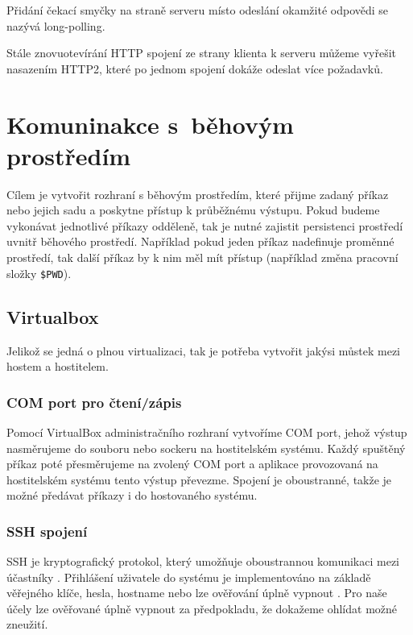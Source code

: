 Přidání čekací smyčky na straně serveru místo odeslání okamžité odpovědi se nazývá long-polling.

Stále znovuotevírání HTTP spojení ze strany klienta k serveru můžeme vyřešit nasazením HTTP2, které po jednom spojení dokáže odeslat více požadavků.

\section{Komuninakce s~běhovým prostředím}

Cílem je vytvořit rozhraní s běhovým prostředím, které přijme zadaný příkaz nebo jejich sadu a poskytne přístup k průběžnému výstupu.
Pokud budeme vykonávat jednotlivé příkazy odděleně, tak je nutné zajistit persistenci prostředí uvnitř běhového prostředí.
Například pokud jeden příkaz nadefinuje proměnné prostředí, tak další příkaz by k nim měl mít přístup (například změna pracovní složky \verb|$PWD|).

\subsection{Virtualbox}

Jelikož se jedná o plnou virtualizaci, tak je potřeba vytvořit jakýsi můstek mezi hostem a hostitelem.

\subsubsection{COM port pro čtení/zápis}

Pomocí VirtualBox administračního rozhraní vytvoříme COM port, jehož výstup nasměrujeme do souboru nebo sockeru na hostitelském systému.
Každý spuštěný příkaz poté přesměrujeme na zvolený COM port a aplikace provozovaná na hostitelském systému tento výstup převezme.
Spojení je oboustranné, takže je možné předávat příkazy i do hostovaného systému.
\cite{virtualbox_serial}

\subsubsection{SSH spojení}

SSH je kryptografický protokol, který umožňuje oboustrannou komunikaci mezi účastníky \cite{ssh_rfc}.
Přihlášení uživatele do systému je implementováno na základě věřejného klíče, hesla, hostname nebo lze ověřování úplně vypnout \cite{ssh_auth_rfc}.
Pro naše účely lze ověřované úplně vypnout za předpokladu, že dokažeme ohlídat možné zneužití.

